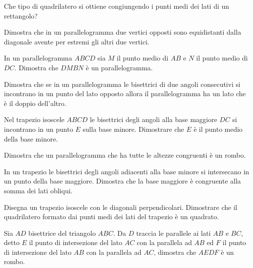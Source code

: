 \begin{multicols}{2}
\begin{esercizio}
\label{ese:4.51}
Che tipo di quadrilatero si ottiene congiungendo i punti medi dei lati di un rettangolo?
\end{esercizio}

\begin{esercizio}
\label{ese:4.52}
Dimostra che in un parallelogramma due vertici opposti sono equidistanti dalla diagonale avente per estremi gli altri due vertici.
\end{esercizio}

\begin{esercizio}
\label{ese:4.53}
In un parallelogramma $ABCD$ sia $M$ il punto medio di $AB$ e $N$ il punto medio di $DC$. Dimostra che $DMBN$ è un parallelogramma.
\end{esercizio}

\begin{esercizio}
\label{ese:4.54}
Dimostra che se in un parallelogramma le bisettrici di due angoli consecutivi si incontrano in un punto del lato opposto allora il parallelogramma ha un lato che è il doppio dell'altro.
\end{esercizio}

\begin{esercizio}
\label{ese:4.55}
Nel trapezio isoscele $ABCD$ le bisettrici degli angoli alla base maggiore $DC$ si incontrano in un punto $E$ sulla base minore. Dimostrare che $E$ è il punto medio della base minore.
\end{esercizio}

\begin{esercizio}
\label{ese:4.56}
Dimostra che un parallelogramma che ha tutte le altezze congruenti è un rombo.
\end{esercizio}

\begin{esercizio}
\label{ese:4.57}
In un trapezio le bisettrici degli angoli adiacenti alla base minore si intersecano in un punto della base maggiore. Dimostra che la base maggiore è congruente alla somma dei lati obliqui.
\end{esercizio}

\begin{esercizio}
\label{ese:4.58}
Disegna un trapezio isoscele con le diagonali perpendicolari. Dimostrare che il quadrilatero formato dai punti medi dei lati del trapezio è un quadrato.
\end{esercizio}

\begin{esercizio}
\label{ese:4.59}
Sia $AD$ bisettrice del triangolo $ABC$. Da $D$ traccia le parallele ai lati $AB$ e $BC$, detto $E$ il punto di intersezione del lato $AC$ con la parallela ad $AB$ ed $F$ il punto di intersezione del lato $AB$ con la parallela ad $AC$, dimostra che $AEDF$ è un rombo.
\end{esercizio}

\end{multicols}

